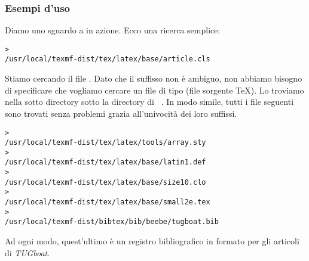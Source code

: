 \documentclass{article}
\begin{document}
\subsubsection{Esempi d'uso}
\label{sec:examples-of-use}

Diamo uno sguardo a \KPS{} in azione. Ecco una ricerca semplice:

\begin{alltt}
> 
   /usr/local/texmf-dist/tex/latex/base/article.cls
\end{alltt}
Stiamo cercando il file . Dato che il suffisso
 non è ambiguo, non abbiamo bisogno di specificare che vogliamo
cercare un file di tipo  (file sorgente \TeX). Lo troviamo
nella sotto directory  sotto la directory di \TL\
. In modo simile, tutti i file seguenti sono trovati
senza problemi grazia all'univocità dei loro suffissi.
\begin{alltt}
> 
   /usr/local/texmf-dist/tex/latex/tools/array.sty
> 
   /usr/local/texmf-dist/tex/latex/base/latin1.def
> 
   /usr/local/texmf-dist/tex/latex/base/size10.clo
> 
   /usr/local/texmf-dist/tex/latex/base/small2e.tex
> 
   /usr/local/texmf-dist/bibtex/bib/beebe/tugboat.bib
\end{alltt}

Ad ogni modo, quest'ultimo è un registro bibliografico in formato
\BibTeX{} per gli articoli di \textsl{TUGboat}.
\end{document}
